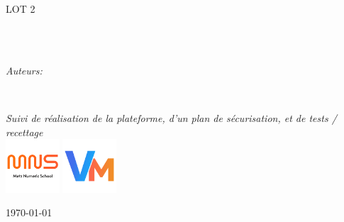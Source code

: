 \documentclass[
12pt, 
french, 
singlespacing,
headsepline,
]{Settings}
\author{Alexandre \textsc{GERARD} \\ Vincent \textsc{GIANGRECO}}
\begin{document}
\frontmatter

\pagestyle{plain}


\begin{titlepage}
\begin{center}

\vspace*{.05\textheight}
{\scshape\LARGE \univname\par}\vspace{1.5cm}
\textsc{\Large LOT 2}\\[0.5cm]

\HRule \\[0.4cm]
{\huge \bfseries \ttitle\par}\vspace{0.4cm}
\HRule \\[1.5cm]
 
\begin{minipage}[t]{1\textwidth}
\begin{center} \large
\emph{Auteurs:}\\
{\authorname}
\end{center}
\end{minipage}
\begin{minipage}[t]{0.4\textwidth}
\end{minipage}\\[3cm]
 
\vfill

\large \textit{Suivi de réalisation de la plateforme, d'un plan de sécurisation, et de tests / recettage}\\[0.3cm]
\vspace*{15mm}
\includegraphics[width=20mm]{medias/mns.png}
\hspace*{15mm}
\includegraphics[width=20mm]{medias/VM.png}

\vfill

{\large \today}\\[14cm]

 
\vfill
\end{center}
\end{titlepage}
\end{document}
